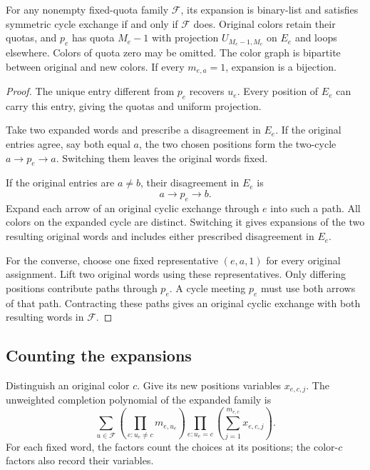 \begin{proposition}
For any nonempty fixed-quota family $\mathcal F$, its expansion is
binary-list and satisfies symmetric cycle exchange if and only if
$\mathcal F$ does. Original colors retain their quotas, and $p_e$ has
quota $M_e-1$ with projection
$U_{M_e-1,M_e}$ on $E_e$ and loops elsewhere. Colors of quota zero may
be omitted. The color graph is bipartite between original and new colors.
If every $m_{e,a}=1$, expansion is a bijection.
\end{proposition}

\begin{proof}
The unique entry different from $p_e$ recovers $u_e$. Every position
of $E_e$ can carry this entry, giving the quotas and uniform projection.

Take two expanded words and prescribe a disagreement in $E_e$.
If the original entries agree, say both equal $a$, the two chosen
positions form the two-cycle $a\to p_e\to a$. Switching them leaves
the original words fixed.

If the original entries are $a\ne b$, their disagreement in $E_e$ is
\[
 a\longrightarrow p_e\longrightarrow b.
\]
Expand each arrow of an original cyclic exchange through $e$ into such
a path. All colors on the expanded cycle are distinct. Switching it
gives expansions of the two resulting original words and includes
either prescribed disagreement in $E_e$.

For the converse, choose one fixed representative $(e,a,1)$ for every
original assignment. Lift two original words using these representatives.
Only differing positions contribute paths through $p_e$. A cycle meeting
$p_e$ must use both arrows of that path. Contracting these paths gives
an original cyclic exchange with both resulting words in $\mathcal F$.
\end{proof}

\subsection[slotCounting]{Counting the expansions}

Distinguish an original color $c$. Give its new positions variables
$x_{e,c,j}$. The unweighted completion polynomial of the expanded family
is
\[
 \sum_{u\in\mathcal F}
 \left(\prod_{e:u_e\ne c}m_{e,u_e}\right)
 \prod_{e:u_e=c}
 \left(\sum_{j=1}^{m_{e,c}}x_{e,c,j}\right).
\]
For each fixed word, the factors count the choices at its positions;
the color-$c$ factors also record their variables.

